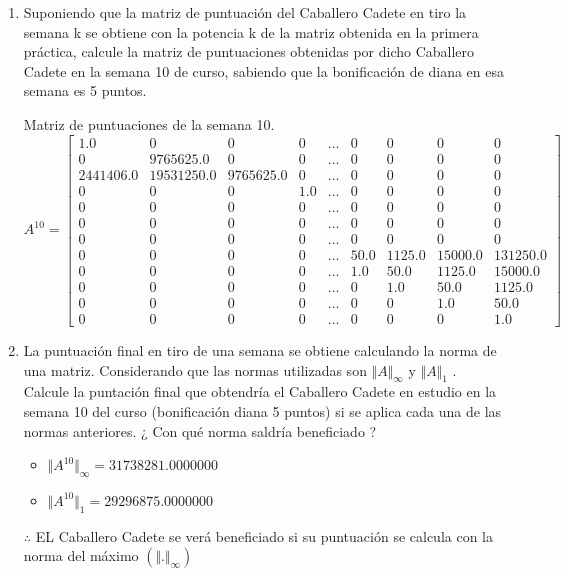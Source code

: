 \documentclass[12pt,a4paper]{article}
\begin{document}
\begin{enumerate}
	\item Suponiendo que la matriz de puntuación del Caballero Cadete en tiro la semana k se obtiene con la potencia k de la matriz obtenida en la primera práctica, calcule la matriz de puntuaciones obtenidas por dicho Caballero Cadete en la semana 10 de curso, sabiendo que la bonificación de diana en esa semana es 5 puntos.
	
	Matriz de puntuaciones de la semana  10.
	$$
	A^{10}=
	\begin{bmatrix}
1.0	&	0	&	0	&	0	&	\ldots	&	0	&	0	&	0	&	0\\
0	&	9765625.0	&	0	&	0	&	\ldots	&	0	&	0	&	0	&	0\\
2441406.0	&	19531250.0	&	9765625.0	&	0	&	\ldots	&	0	&	0	&	0	&	0\\
0	&	0	&	0	&	1.0	&	\ldots	&	0	&	0	&	0	&	0\\
0	&	0	&	0	&	0	&	\ldots	&	0	&	0	&	0	&	0\\
0	&	0	&	0	&	0	&	\ldots	&	0	&	0	&	0	&	0\\
0	&	0	&	0	&	0	&	\ldots	&	0	&	0	&	0	&	0\\
0	&	0	&	0	&	0	&	\ldots	&	50.0	&	1125.0	&	15000.0	&	131250.0\\
0	&	0	&	0	&	0	&	\ldots	&	1.0	&	50.0	&	1125.0	&	15000.0\\
0	&	0	&	0	&	0	&	\ldots	&	0	&	1.0	&	50.0	&	1125.0\\
0	&	0	&	0	&	0	&	\ldots	&	0	&	0	&	1.0	&	50.0\\
0	&	0	&	0	&	0	&	\ldots	&	0	&	0	&	0	&	1.0
\end{bmatrix}	
	$$    
	
	
	\item La puntuación final en tiro de una semana se obtiene calculando la norma de una matriz. Considerando que las normas utilizadas son $\Vert A\Vert_{\infty}$ y $\Vert A\Vert_{1}$ . Calcule la puntación final que obtendría el Caballero Cadete en estudio en la semana 10 del curso (bonificación diana 5 puntos) si se aplica cada una de las normas anteriores. ¿ Con qué norma saldría beneficiado ?
		\begin{itemize}
			\item $\Vert A^{10}\Vert_{\infty} = 31738281.0000000$
			\item $\Vert A^{10}\Vert_{1} = 29296875.0000000$
		\end{itemize}
		$\therefore$ EL Caballero Cadete se verá beneficiado si su puntuación se calcula con la norma del máximo $(\Vert .\Vert_{\infty})$
\end{enumerate}
\end{document}

